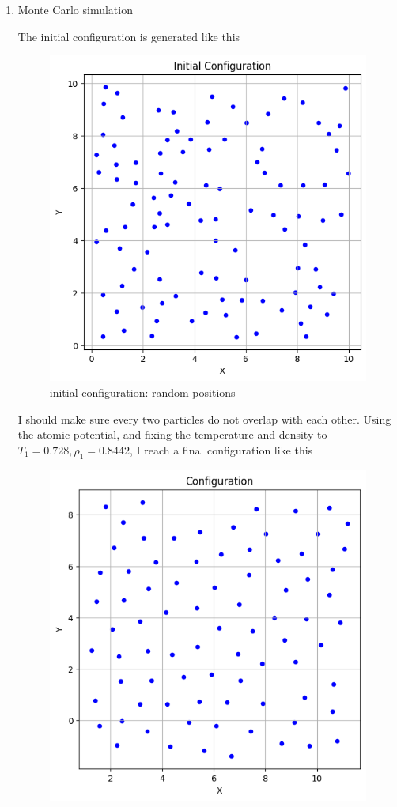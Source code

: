\documentclass[letterpaper,12pt]{article}
\numberwithin{equation}{section}
\begin{document}
\begin{enumerate}[label=(\alph*)]
    \item Monte Carlo simulation
    
    The initial configuration is generated like this 
    \begin{figure}[H]
        \centering
        \includegraphics[width=.8\textwidth]{random_init_config.png}
        \caption{initial configuration: random positions}
    \end{figure}
    I should make sure every two particles do not overlap with each other. Using the atomic potential, and fixing the temperature and density to $T_1=0.728, \rho_1=0.8442$, I reach a final configuration like this 
    \begin{figure}[H]
        \centering
        \includegraphics[width=.8\textwidth]{final_config_mc1.png}

\end{figure}
\end{enumerate}
\end{document}
